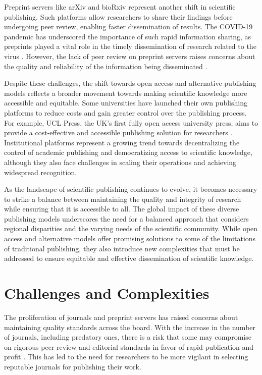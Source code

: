\documentclass{article}
\begin{document}
Preprint servers like arXiv and bioRxiv represent another shift in scientific publishing. Such platforms allow researchers to share their findings before undergoing peer review, enabling faster dissemination of results. The COVID-19 pandemic has underscored the importance of such rapid information sharing, as preprints played a vital role in the timely dissemination of research related to the virus \cite{kwon2020swamped}. However, the lack of peer review on preprint servers raises concerns about the quality and reliability of the information being disseminated \cite{tennant2019hot}.

Despite these challenges, the shift towards open access and alternative publishing models reflects a broader movement towards making scientific knowledge more accessible and equitable. Some universities have launched their own publishing platforms to reduce costs and gain greater control over the publishing process. For example, UCL Press, the UK's first fully open access university press, aims to provide a cost-effective and accessible publishing solution for researchers \cite{ayris2015ucl}. Institutional platforms represent a growing trend towards decentralizing the control of academic publishing and democratizing access to scientific knowledge, although they also face challenges in scaling their operations and achieving widespread recognition.

As the landscape of scientific publishing continues to evolve, it becomes necessary to strike a balance between maintaining the quality and integrity of research while ensuring that it is accessible to all.  The global impact of these diverse publishing models underscores the need for a balanced approach that considers regional disparities and the varying needs of the scientific community. While open access and alternative models offer promising solutions to some of the limitations of traditional publishing, they also introduce new complexities that must be addressed to ensure equitable and effective dissemination of scientific knowledge.


\section{Challenges and Complexities}

The proliferation of journals and preprint servers has raised concerns about maintaining quality standards across the board. With the increase in the number of journals, including predatory ones, there is a risk that some may compromise on rigorous peer review and editorial standards in favor of rapid publication and profit \cite{tennant2019hot}. This has led to the need for researchers to be more vigilant in selecting reputable journals for publishing their work.
\end{document}
